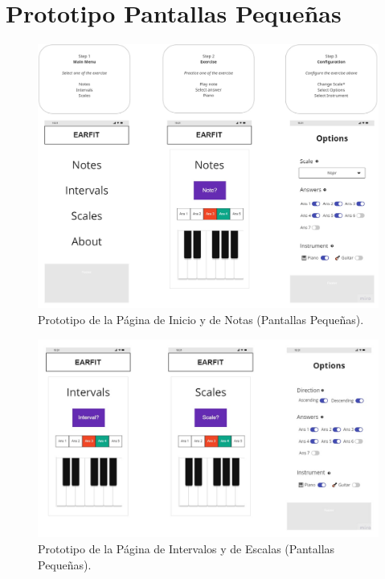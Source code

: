 \documentclass[12pt,twoside,titlepage]{report}
\begin{document}
\section{Prototipo Pantallas Pequeñas}

\begin{figure}[H]
    \centering
    \includegraphics[scale=0.2]{Design Thinking/Prototipo/Small/Prototipo}
    \caption{Prototipo de la Página de Inicio y de Notas (Pantallas Pequeñas).}
    \label{fig:Prototipo1}
\end{figure}

\begin{figure}[H]
    \centering
    \includegraphics[scale=0.3]{Design Thinking/Prototipo/Small/Prototipo2}
    \caption{Prototipo de la Página de Intervalos y de Escalas (Pantallas Pequeñas).}
    \label{fig:Prototipo2}
\end{figure}
\end{document}
